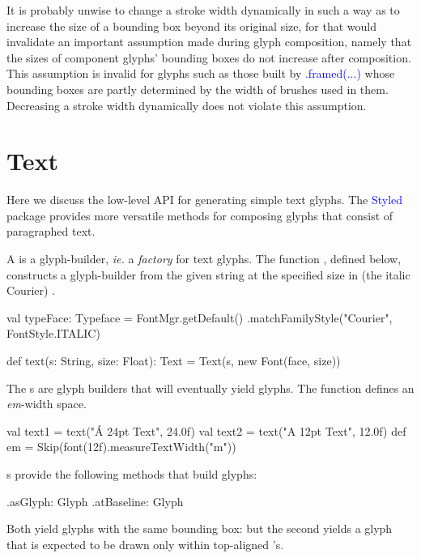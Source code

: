 \documentclass[12pt,a4paper]{article}
\def\Scala#1{\textcolor{blue}{\textsf{#1}}}
\let\scalasize=\footnotesize
\def\S#1{\section{#1}}
\begin{document}
It is probably unwise to change a stroke width dynamically in such a
way as to increase the size of a bounding box beyond its original
size, for that would invalidate an important assumption made during glyph
composition, namely that the sizes of component glyphs' bounding
boxes do not increase after composition.  This assumption is invalid
for glyphs such as those built by \Scala{.framed(...)} whose
bounding boxes are partly determined by the width of  brushes used
in them. Decreasing a stroke width dynamically does not violate
this assumption.

\clearpage


\S{Text}
Here we discuss the low-level API for generating simple text glyphs. {The \textcolor{blue}{\textsf{Styled}}
package provides more versatile methods for composing glyphs that consist
of paragraphed text.}

A  is a glyph-builder, \textit{ie.} a \textit{factory}
for text glyphs. The function , defined below, constructs
a glyph-builder from the given string at the specified size in (the
italic Courier) .

\begin{scala}
    val typeFace: Typeface =
          FontMgr.getDefault()
                 .matchFamilyStyle("Courier", FontStyle.ITALIC)

    def text(s: String, size: Float): Text =
          Text(s, new Font(face, size))
\end{scala}

The s  are glyph builders that will eventually
yield glyphs. The function  defines an \textit{em}-width space.

\begin{scala}
    val text1 = text("Á 24pt Text", 24.0f)
    val text2 = text("A 12pt Text", 12.0f)
    def em    = Skip(font(12f).measureTextWidth("m"))
\end{scala}

s provide the following methods that build glyphs:
\begin{scala}
   .asGlyph:    Glyph
   .atBaseline: Glyph
\end{scala}

Both yield glyphs with the same bounding box: but the second yields
a glyph that is expected to be drawn only within top-aligned
's.
\end{document}
